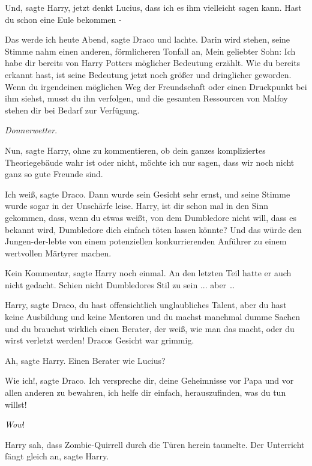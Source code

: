 \glqq{}Und\grqq{}, sagte Harry, \glqq{}jetzt denkt Lucius, dass ich es ihm
vielleicht sagen kann. Hast du schon eine Eule bekommen -\grqq{}

\glqq{}Das werde ich heute Abend\grqq{}, sagte Draco und lachte. \glqq{}Darin wird
stehen\grqq{}, seine Stimme nahm einen anderen, förmlicheren Tonfall an, \glqq{}
Mein geliebter Sohn: Ich habe dir bereits von Harry Potters möglicher Bedeutung
erzählt. Wie du bereits erkannt hast, ist seine Bedeutung jetzt noch größer und
dringlicher geworden. Wenn du irgendeinen möglichen Weg der Freundschaft oder
einen Druckpunkt bei ihm siehst, musst du ihn verfolgen, und die gesamten
Ressourcen von Malfoy stehen dir bei Bedarf zur Verfügung.\grqq{}

\emph{Donnerwetter}.

\glqq{}Nun\grqq{}, sagte Harry, \glqq{}ohne zu kommentieren, ob dein ganzes
kompliziertes Theoriegebäude wahr ist oder nicht, möchte ich nur sagen, dass wir
noch nicht ganz so gute Freunde sind.\grqq{}

\glqq{}Ich weiß\grqq{}, sagte Draco. Dann wurde sein Gesicht sehr ernst, und
seine Stimme wurde sogar in der Unschärfe leise. \glqq{}Harry, ist dir schon mal
in den Sinn gekommen, dass, wenn du etwas weißt, von dem Dumbledore nicht will,
dass es bekannt wird, Dumbledore dich einfach töten lassen könnte? Und das würde
den Jungen-der-lebte von einem potenziellen konkurrierenden Anführer zu einem
wertvollen Märtyrer machen.\grqq{}

\glqq{}Kein Kommentar\grqq{}, sagte Harry noch einmal. An den letzten Teil hatte
er auch nicht gedacht. Schien nicht Dumbledores Stil zu sein ... aber …

\glqq{}Harry\grqq{}, sagte Draco, \glqq{}du hast offensichtlich unglaubliches
Talent, aber du hast keine Ausbildung und keine Mentoren und du machst manchmal
dumme Sachen und du brauchst wirklich einen Berater, der weiß, wie man das
macht, oder du wirst verletzt werden!\grqq{} Dracos Gesicht war grimmig.

\glqq{}Ah\grqq{}, sagte Harry. \glqq{}Einen Berater wie Lucius?\grqq{}

\glqq{}Wie ich!\grqq{}, sagte Draco. \glqq{}Ich verspreche dir, deine Geheimnisse
vor Papa und vor allen anderen zu bewahren, ich helfe dir einfach,
herauszufinden, was du tun willst!\grqq{}

\emph{Wow}!

Harry sah, dass Zombie-Quirrell durch die Türen herein taumelte. \glqq{}Der
Unterricht fängt gleich an\grqq{}, sagte Harry.

